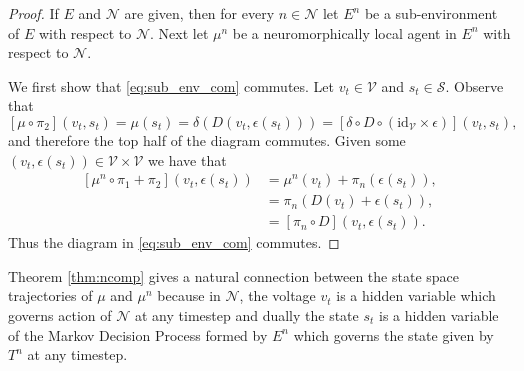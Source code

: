 \documentclass{article} %
\numberwithin{equation}{subsection}
\numberwithin{theorem}{subsection}
\theoremstyle{named}
\def\scriptv{{\mathcal V}}
\def\scriptn{{\mathcal N}}
\def\scripts{{\mathcal S}}
\begin{document}
\begin{proof}
  If $E$ and $\scriptn$ are given, then for every $n \in \scriptn$ let $E^n$ be a sub-environment of $E$ with respect to $\scriptn$. Next let $\mu^n$ be a neuromorphically local agent in $E^n$ with respect to $\scriptn$.

  We first show that \eqref{eq:sub_env_com} commutes. Let $v_t \in \scriptv$ and $s_t \in \scripts$. Observe that
\begin{equation*}
\left[\mu \circ \pi_2\right](v_t, s_t) = \mu(s_t) = \delta\left(D(v_t, \epsilon(s_t))\right) = \left[\delta \circ D \circ (\mathrm{id}_\scriptv \times \epsilon)\right](v_t, s_t),
\end{equation*}
and therefore the top half of the diagram commutes. Given some $(v_t, \epsilon(s_t)) \in \scriptv \times \scriptv$ we have that 
\begin{equation*}
  \begin{aligned}
    \left[ \mu^n \circ \pi_1 + \pi_2\right] (v_t, \epsilon(s_t))  &= \mu^n(v_t) + \pi_n(\epsilon(s_t)),\\
     &= \pi_n\left(D(v_t) + \epsilon(s_t)\right), \\
     &= \left[\pi_n\circ D\right](v_t, \epsilon(s_t)). 
  \end{aligned}
\end{equation*}
Thus the diagram in \eqref{eq:sub_env_com} commutes. 
\end{proof}

Theorem \ref{thm:ncomp} gives a natural connection between the state space trajectories of $\mu$ and $\mu^n$ because in $\scriptn$, the voltage $v_t$ is a hidden variable which governs action of $\scriptn$ at any timestep and dually the state $s_t$ is a hidden variable of the Markov Decision Process formed by $E^n$ which governs the state given by $T^n$ at any timestep. 
\end{document}
